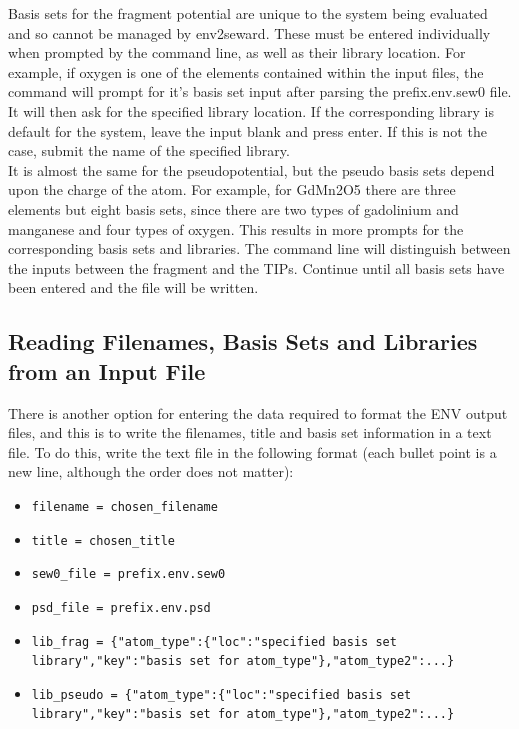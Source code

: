\documentclass[10pt]{article}
\begin{document}
Basis sets for the fragment potential are unique to the system being evaluated and so cannot be managed by env2seward. These must be entered individually when prompted by the command line, as well as their library location. For example, if oxygen is one of the elements contained within the input files, the command will prompt for it's basis set input after parsing the prefix.env.sew0 file. It will then ask for the specified library location. If the corresponding library is default for the system, leave the input blank and press enter. If this is not the case, submit the name of the specified library.
\\
It is almost the same for the pseudopotential, but the pseudo basis sets depend upon the charge of the atom. For example, for GdMn2O5 there are three elements but eight basis sets, since there are two types of gadolinium and manganese and four types of oxygen. This results in more prompts for the corresponding basis sets and libraries. The command line will distinguish between the inputs between the fragment and the TIPs. Continue until all basis sets have been entered and the file will be written.

\subsection{Reading Filenames, Basis Sets and Libraries from an Input File}

There is another option for entering the data required to format the ENV output files, and this is to write the filenames, title and basis set information in a text file. To do this, write the text file in the following format (each bullet point is a new line, although the order does not matter):

\begin{itemize}
	\item \texttt{filename = chosen\_filename}
	\item \texttt{title = chosen\_title}
	\item \texttt{sew0\_file = prefix.env.sew0}
	\item \texttt{psd\_file = prefix.env.psd}
	\item \texttt{lib\_frag = \{"atom\_type":\{"loc":"specified basis set library","key":"basis set for atom\_type"\},"atom\_type2":...\}}
	\item \texttt{lib\_pseudo = \{"atom\_type":\{"loc":"specified basis set library","key":"basis set for atom\_type"\},"atom\_type2":...\}}
\end{itemize}
\end{document}
